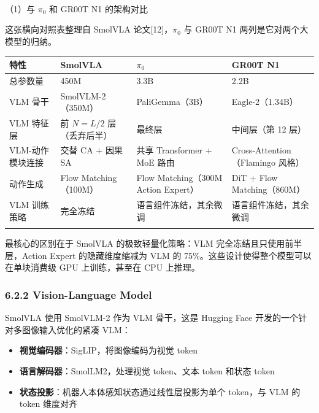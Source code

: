 \documentclass[
  chinese,
]{ctexart}
\makeatletter
\let\oldparagraph\paragraph
\renewcommand{\paragraph}{
    \@ifstar
      \xxxParagraphStar
      \xxxParagraphNoStar
  }
\newcommand{\xxxParagraphStar}[1]{\oldparagraph*{#1}\mbox{}}
\newcommand{\xxxParagraphNoStar}[1]{\oldparagraph{#1}\mbox{}}
\providecommand{\tightlist}{%
  \setlength{\itemsep}{0pt}\setlength{\parskip}{0pt}}
\makeatother
\begin{document}
\paragraph{\texorpdfstring{（1）与 \(\pi_0\) 和 GR00T N1
的架构对比}{（1）与 \textbackslash pi\_0 和 GR00T N1 的架构对比}}\label{ux4e0e-pi_0-ux548c-gr00t-n1-ux7684ux67b6ux6784ux5bf9ux6bd4}

这张横向对照表整理自 SmolVLA 论文{[}12{]}，\(\pi_0\) 与 GR00T N1
两列是它对两个大模型的归纳。

\begin{center}
\begin{tabular}{@{}>{\raggedright\arraybackslash}p{} >{\raggedright\arraybackslash}p{} >{\raggedright\arraybackslash}p{} >{\raggedright\arraybackslash}p{}@{}}
\toprule\noalign{}
特性 & SmolVLA & \(\pi_0\) & GR00T N1 \\
\midrule\noalign{}
总参数量 & 450M & 3.3B & 2.2B \\
VLM 骨干 & SmolVLM-2（350M） & PaliGemma（3B） & Eagle-2（1.34B） \\
VLM 特征层 & 前 \(N=L/2\) 层（丢弃后半） & 最终层 & 中间层（第 12 层） \\
VLM-动作模块连接 & 交替 CA + 因果 SA & 共享 Transformer + MoE 路由 & Cross-Attention（Flamingo 风格） \\
动作生成 & Flow Matching（100M） & Flow Matching（300M Action Expert） & DiT + Flow Matching（860M） \\
VLM 训练策略 & 完全冻结 & 语言组件冻结，其余微调 & 语言组件冻结，其余微调 \\
\bottomrule\noalign{}
\end{tabular}
\end{center}

最核心的区别在于 SmolVLA 的极致轻量化策略：VLM
完全冻结且只使用前半层，Action Expert 的隐藏维度缩减为 VLM 的
75\%。这些设计使得整个模型可以在单块消费级 GPU 上训练，甚至在 CPU
上推理。

\subsubsection{6.2.2 Vision-Language Model}\label{vision-language-model}

SmolVLA 使用 SmolVLM-2 作为 VLM 骨干，这是 Hugging Face
开发的一个针对多图像输入优化的紧凑 VLM：

\begin{itemize}
\tightlist
\item
  \textbf{视觉编码器}：SigLIP，将图像编码为视觉 token
\item
  \textbf{语言解码器}：SmolLM2，处理视觉 token、文本 token 和状态 token
\item
  \textbf{状态投影}：机器人本体感知状态通过线性层投影为单个 token，与
  VLM 的 token 维度对齐
\end{itemize}
\end{document}

